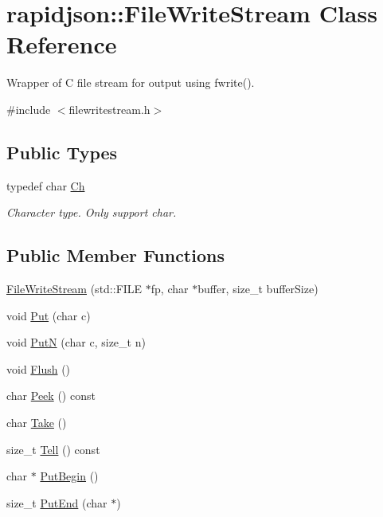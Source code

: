 \hypertarget{classrapidjson_1_1_file_write_stream}{}\section{rapidjson\+::File\+Write\+Stream Class Reference}
\label{classrapidjson_1_1_file_write_stream}


Wrapper of C file stream for output using fwrite().  




{\ttfamily \#include $<$filewritestream.\+h$>$}

\subsection*{Public Types}
\begin{DoxyCompactItemize}
\item 
typedef char \mbox{\hyperlink{classrapidjson_1_1_file_write_stream_afc606cc81f6c3709d81bf99b30566330}{Ch}}
\begin{DoxyCompactList}\small\item\em Character type. Only support char. \end{DoxyCompactList}\end{DoxyCompactItemize}
\subsection*{Public Member Functions}
\begin{DoxyCompactItemize}
\item 
\mbox{\hyperlink{classrapidjson_1_1_file_write_stream_a9abf2078f78a30c7ad868f480e4221be}{File\+Write\+Stream}} (std\+::\+F\+I\+LE $\ast$fp, char $\ast$buffer, size\+\_\+t buffer\+Size)
\item 
void \mbox{\hyperlink{classrapidjson_1_1_file_write_stream_a5a3b2b270c90f4672400d36a4f056fbc}{Put}} (char c)
\item 
void \mbox{\hyperlink{classrapidjson_1_1_file_write_stream_a6e66d814422fd311a908cf2145535b99}{PutN}} (char c, size\+\_\+t n)
\item 
void \mbox{\hyperlink{classrapidjson_1_1_file_write_stream_ad21fb3d1318a91a1d32ce971378981e1}{Flush}} ()
\item 
char \mbox{\hyperlink{classrapidjson_1_1_file_write_stream_a8a9816245140dac55d66c24d5f21e231}{Peek}} () const
\item 
char \mbox{\hyperlink{classrapidjson_1_1_file_write_stream_a6b3d198633b02a7d016b8833b4615b33}{Take}} ()
\item 
size\+\_\+t \mbox{\hyperlink{classrapidjson_1_1_file_write_stream_ab57d1149f396b095b1eab2154974983d}{Tell}} () const
\item 
char $\ast$ \mbox{\hyperlink{classrapidjson_1_1_file_write_stream_a330ab2dff49aca7015f92e699a675f11}{Put\+Begin}} ()
\item 
size\+\_\+t \mbox{\hyperlink{classrapidjson_1_1_file_write_stream_ac755d1f640dc82a2359b2867ce09ac0c}{Put\+End}} (char $\ast$)
\end{DoxyCompactItemize}
